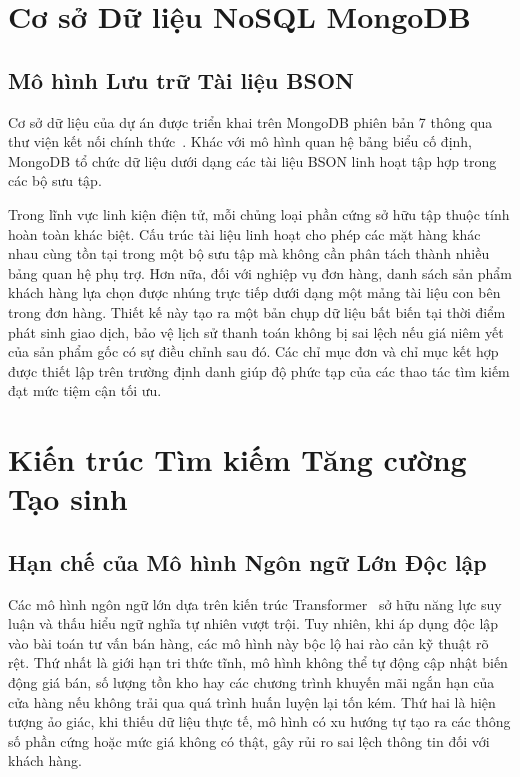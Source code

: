 \section{Cơ sở Dữ liệu NoSQL MongoDB}
\subsection{Mô hình Lưu trữ Tài liệu BSON}
Cơ sở dữ liệu của dự án được triển khai trên MongoDB phiên bản 7 thông qua thư viện kết nối chính thức~\cite{chodorow2013mongodb}. Khác với mô hình quan hệ bảng biểu cố định, MongoDB tổ chức dữ liệu dưới dạng các tài liệu BSON linh hoạt tập hợp trong các bộ sưu tập.

Trong lĩnh vực linh kiện điện tử, mỗi chủng loại phần cứng sở hữu tập thuộc tính hoàn toàn khác biệt. Cấu trúc tài liệu linh hoạt cho phép các mặt hàng khác nhau cùng tồn tại trong một bộ sưu tập mà không cần phân tách thành nhiều bảng quan hệ phụ trợ. Hơn nữa, đối với nghiệp vụ đơn hàng, danh sách sản phẩm khách hàng lựa chọn được nhúng trực tiếp dưới dạng một mảng tài liệu con bên trong đơn hàng. Thiết kế này tạo ra một bản chụp dữ liệu bất biến tại thời điểm phát sinh giao dịch, bảo vệ lịch sử thanh toán không bị sai lệch nếu giá niêm yết của sản phẩm gốc có sự điều chỉnh sau đó. Các chỉ mục đơn và chỉ mục kết hợp được thiết lập trên trường định danh giúp độ phức tạp của các thao tác tìm kiếm đạt mức tiệm cận tối ưu.

\section{Kiến trúc Tìm kiếm Tăng cường Tạo sinh}
\subsection{Hạn chế của Mô hình Ngôn ngữ Lớn Độc lập}
Các mô hình ngôn ngữ lớn dựa trên kiến trúc Transformer~\cite{vaswani2017attention} sở hữu năng lực suy luận và thấu hiểu ngữ nghĩa tự nhiên vượt trội. Tuy nhiên, khi áp dụng độc lập vào bài toán tư vấn bán hàng, các mô hình này bộc lộ hai rào cản kỹ thuật rõ rệt. Thứ nhất là giới hạn tri thức tĩnh, mô hình không thể tự động cập nhật biến động giá bán, số lượng tồn kho hay các chương trình khuyến mãi ngắn hạn của cửa hàng nếu không trải qua quá trình huấn luyện lại tốn kém. Thứ hai là hiện tượng ảo giác, khi thiếu dữ liệu thực tế, mô hình có xu hướng tự tạo ra các thông số phần cứng hoặc mức giá không có thật, gây rủi ro sai lệch thông tin đối với khách hàng.

